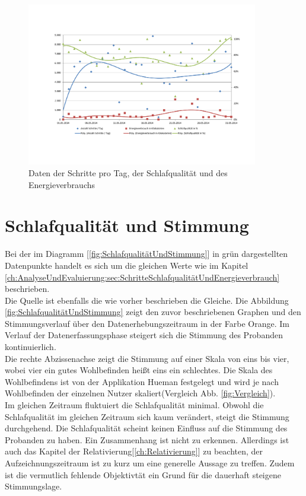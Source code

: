 \begin{figure}[H]
\centering
        \includegraphics[angle=270,width=0.9\textwidth]{images/Analyse/Sleep-Steps-kcal} 
        \caption[Daten der Schritte pro Tag, der Schlafqualität und des Energieverbrauchs]{Daten der Schritte pro Tag, der Schlafqualität und des Energieverbrauchs}
        \label{fig:SchritteSchlafqualitätUndEnergieverbrauch}
\end{figure}

\section{Schlafqualität und Stimmung}
\label{ch:AnalyseUndEvaluierung:sec:SchlafqualitätUndStimmung}

Bei der im Diagramm [\ref{fig:SchlafqualitätUndStimmung}] in grün dargestellten Datenpunkte handelt es sich um die gleichen Werte wie im Kapitel \ref{ch:AnalyseUndEvaluierung:sec:SchritteSchlafqualitätUndEnergieverbrauch} beschrieben. \\
Die Quelle ist ebenfalls die wie vorher beschrieben die Gleiche.
Die Abbildung \ref{fig:SchlafqualitätUndStimmung} zeigt den zuvor beschriebenen Graphen und den Stimmungsverlauf über den Datenerhebungszeitraum in der Farbe Orange.
Im Verlauf der Datenerfassungsphase steigert sich die Stimmung des Probanden kontinuierlich. \\
Die rechte Abzissenachse zeigt die Stimmung auf einer Skala von eins bis vier, wobei vier ein gutes Wohlbefinden heißt eins ein schlechtes.
Die Skala des Wohlbefindens ist von der Applikation Hueman festgelegt und wird je nach Wohlbefinden der einzelnen Nutzer skaliert(Vergleich Abb. \ref{fig:Vergleich}).
\\
Im gleichen Zeitraum fluktuiert die Schlafqualität minimal.
Obwohl die Schlafqualität im gleichen Zeitraum sich kaum verändert, steigt die Stimmung durchgehend. 
Die Schlafqualität scheint keinen Einfluss auf die Stimmung des Probanden zu haben.
Ein Zusammenhang ist nicht zu erkennen.
Allerdings ist auch das Kapitel der Relativierung[\ref{ch:Relativierung}] zu beachten, der Aufzeichnungszeitraum ist zu kurz um eine generelle Aussage zu treffen.
Zudem ist die vermutlich fehlende Objektivtät ein Grund für die dauerhaft steigene Stimmungslage.


